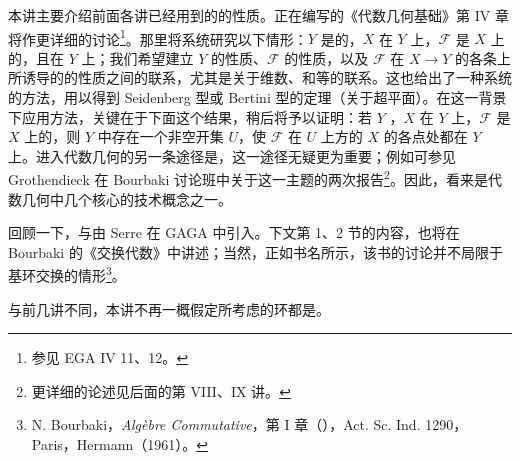 
本讲主要介绍前面各讲已经用到的的性质。正在编写的《代数几何基础》第 IV 章将作更详细的讨论\footnote{参见 EGA IV 11、12。}。那里将系统研究以下情形：$Y$ 是的，$X$ 在 $Y$ 上，$\mathcal F$ 是 $X$ 上的，且在 $Y$ 上；我们希望建立 $Y$ 的性质、$\mathcal F$ 的性质，以及 $\mathcal F$ 在 $X\to Y$ 的各条上所诱导的的性质之间的联系，尤其是关于维数、和等的联系。这也给出了一种系统的方法，用以得到 Seidenberg 型或 Bertini 型的定理（关于超平面）。在这一背景下应用方法，关键在于下面这个结果，稍后将予以证明：若 $Y$ ，$X$ 在 $Y$ 上，$\mathcal F$ 是 $X$ 上的，则 $Y$ 中存在一个非空开集 $U$，使 $\mathcal F$ 在 $U$ 上方的 $X$ 的各点处都在 $Y$ 上。进入代数几何的另一条途径是，这一途径无疑更为重要；例如可参见 Grothendieck 在 Bourbaki 讨论班中关于这一主题的两次报告\footnote{更详细的论述见后面的第 VIII、IX 讲。}。因此，看来是代数几何中几个核心的技术概念之一。

回顾一下，与由 Serre 在 GAGA 中引入。下文第 1、2 节的内容，也将在 Bourbaki 的《交换代数》中讲述；当然，正如书名所示，该书的讨论并不局限于基环交换的情形\footnote{N. Bourbaki，\emph{Algèbre Commutative}，第 I 章（），Act. Sc. Ind. 1290，Paris，Hermann（1961）。}。

与前几讲不同，本讲不再一概假定所考虑的环都是。


